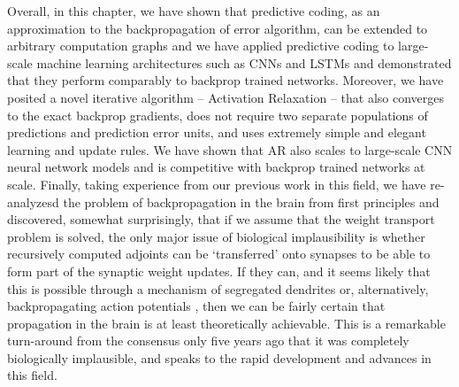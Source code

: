 Overall, in this chapter, we have shown that predictive coding, as an approximation to the backpropagation of error algorithm, can be extended to arbitrary computation graphs and we have applied predictive coding to large-scale machine learning architectures such as CNNs and LSTMs and demonstrated that they perform comparably to backprop trained networks. Moreover, we have posited a novel iterative algorithm -- Activation Relaxation -- that also converges to the exact backprop gradients, does not require two separate populations of predictions and prediction error units, and uses extremely simple and elegant learning and update rules. We have shown that AR also scales to large-scale CNN neural network models and is competitive with backprop trained networks at scale. Finally, taking experience from our previous work in this field, we have re-analyzesd the problem of backpropagation in the brain from first principles and discovered, somewhat surprisingly, that if we assume that the weight transport problem is solved, the only major issue of biological implausibility is whether recursively computed adjoints can be `transferred' onto synapses to be able to form part of the synaptic weight updates. If they can, and it seems likely that this is possible through a mechanism of segregated dendrites or, alternatively, backpropagating action potentials \citep{stuart1997action}, then we can be fairly certain that propagation in the brain is at least theoretically achievable. This is a remarkable turn-around from the consensus only five years ago that it was completely biologically implausible, and speaks to the rapid development and advances in this field.

